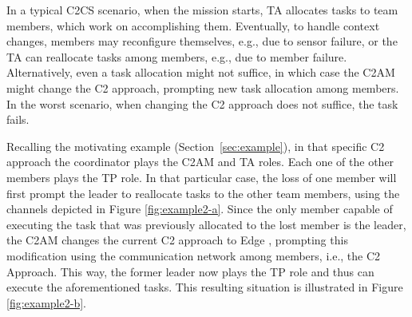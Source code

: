 In a typical C2CS scenario, when the mission starts, TA allocates tasks to team members, which work on accomplishing them. Eventually, to handle context changes, members may reconfigure themselves, e.g., due to sensor failure, or \color{black}the TA \color{black} can reallocate tasks among members, e.g., due to member failure. Alternatively, even a task allocation might not suffice, in which case the C2AM might change the C2 approach, prompting new task allocation among members. \color{black}In the worst scenario, when changing the C2 approach does not suffice, the task fails.\color{black} 


Recalling the motivating example (Section~\ref{sec:example}), in that specific C2 approach the coordinator plays the C2AM and TA roles. Each one of the other members plays the TP role. In that particular case, the loss of one member will first prompt the leader to reallocate tasks to the other team members, using the channels depicted in Figure \ref{fig:example2-a}. 
 Since the only member capable of executing the task that was previously allocated to the lost member is the leader, the C2AM changes the current C2 approach to Edge \citep{FRANCE2014}, prompting this modification using the communication network among members, i.e., the C2 Approach. This way, the former leader now plays the TP role and thus can execute the aforementioned tasks. This resulting situation is illustrated in Figure \ref{fig:example2-b}.

